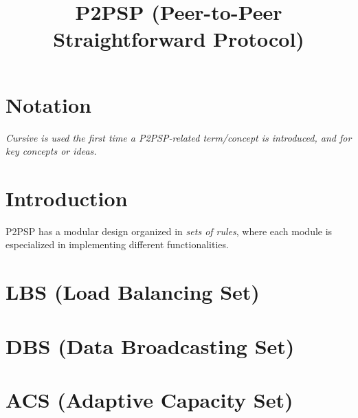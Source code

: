 

\newcommand{\note}[1]{#1}


\newenvironment{notex}
               {\textbf{Note:}
               }
               {
               }

\title{P2PSP (Peer-to-Peer Straightforward Protocol)}
\maketitle

\begin{abstract}

\end{abstract}

\section*{Notation}
\emph{Cursive is used the first time a P2PSP-related term/concept is introduced, and for key concepts or ideas.}

\section*{Introduction}
P2PSP has a modular design organized in \emph{sets of rules}, where
each module is especialized in implementing different functionalities.

\tableofcontents

\section{LBS (Load Balancing Set)}


\section{DBS (Data Broadcasting Set)}


\section{ACS (Adaptive Capacity Set)}


